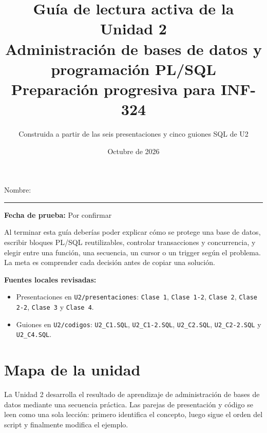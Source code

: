 \documentclass[11pt,a4paper]{article}
\title{\textbf{Guía de lectura activa de la Unidad 2}\\[0.3em]
\large Administración de bases de datos y programación PL/SQL\\[0.5em]
\normalsize Preparación progresiva para INF-324}
\author{Construida a partir de las seis presentaciones y cinco guiones SQL de U2}
\date{Octubre de 2026}
\newcommand{\NombreEstudiante}{Nombre: \rule{6cm}{0.4pt}}
\newcommand{\FechaPrueba}{Por confirmar}
\newcommand{\campo}[1]{\texttt{#1}}
\begin{document}
\maketitle\thispagestyle{empty}
\begin{center}\NombreEstudiante \hfill \textbf{Fecha de prueba:} \FechaPrueba\end{center}

\begin{objetivo}
Al terminar esta guía deberías poder explicar cómo se protege una base de datos, escribir bloques
PL/SQL reutilizables, controlar transacciones y concurrencia, y elegir entre una función, una
secuencia, un cursor o un trigger según el problema. La meta es comprender cada decisión antes de
copiar una solución.
\end{objetivo}

\vfill
\begin{center}
\end{center}
\vfill
\begin{flushleft}
\textbf{Fuentes locales revisadas:}
\begin{itemize}
\item Presentaciones en \campo{U2/presentaciones}: \campo{Clase 1}, \campo{Clase 1-2}, \campo{Clase 2}, \campo{Clase 2-2}, \campo{Clase 3} y \campo{Clase 4}.
\item Guiones en \campo{U2/codigos}: \campo{U2\_C1.SQL}, \campo{U2\_C1-2.SQL}, \campo{U2\_C2.SQL}, \campo{U2\_C2-2.SQL} y \campo{U2\_C4.SQL}.
\end{itemize}
\end{flushleft}
\newpage\tableofcontents\newpage

\section{Mapa de la unidad}
La Unidad 2 desarrolla el resultado de aprendizaje de administración de bases de datos mediante
una secuencia práctica. Las parejas de presentación y código se leen como una sola lección: primero
identifica el concepto, luego sigue el orden del script y finalmente modifica el ejemplo.
\end{document}

